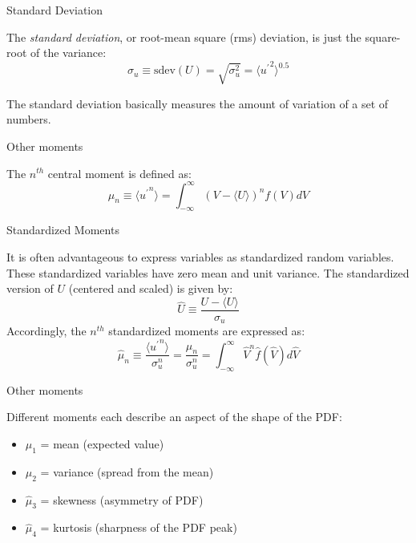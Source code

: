 
\begin{frame}{Standard Deviation}

The \textit{standard deviation}, or root-mean square (rms) deviation, is just the square-root of the variance:
$$\sigma_u \equiv \text{sdev}(U) = \sqrt{\sigma_u^2} = \langle {u^\prime}^2 \rangle^{0.5}$$

The standard deviation basically measures the amount of variation of a set of numbers.
\end{frame}


\begin{frame}{Other moments}

The $n^{th}$ central moment is defined as:
$$\mu_n \equiv \langle {u^\prime}^n \rangle = \int^{\infty}_{-\infty} (V - \langle U \rangle)^n f(V)dV$$
\end{frame}


\begin{frame}{Standardized Moments}

It is often advantageous to express variables as standardized random variables. These standardized variables have zero mean and unit variance.\newline\newline
The standardized version of $U$ (centered and scaled) is given by:
$$\hat U \equiv \frac{U - \langle U \rangle}{\sigma_u}$$
Accordingly, the $n^{th}$ standardized moments are expressed as:
$$\hat \mu_n \equiv \frac{\langle {u^\prime}^n \rangle}{\sigma_u^n} = \frac{\mu_n}{\sigma_u^n}  = \int^{\infty}_{-\infty} \hat V^n \hat f(\hat V)d \hat V$$

\end{frame}


\begin{frame}{Other moments}

Different moments each describe an aspect of the shape of the PDF:
\begin{itemize}
	\item $\mu_1$      = mean (expected value)
	\item $\mu_2$      = variance (spread from the mean)
	\item $\hat \mu_3$ = skewness (asymmetry of PDF)
	\item $\hat \mu_4$ = kurtosis (sharpness of the PDF peak)
\end{itemize}

\end{frame}

